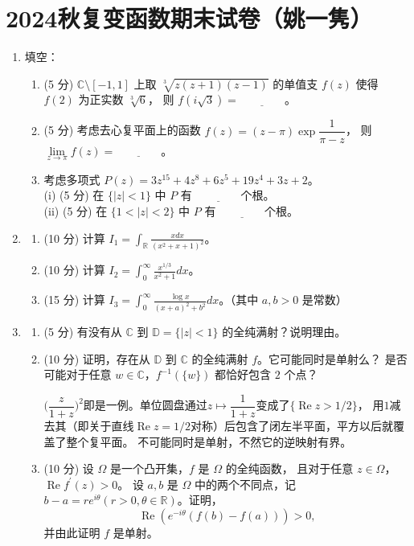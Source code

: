 \section{2024秋复变函数期末试卷（姚一隽）}
\begin{enumerate}
\item[一] 填空：
\begin{enumerate}[label=(\arabic*)]
\item (5 分) $\mathbb{C} \setminus [-1,1]$ 上取 $\sqrt[3]{z(z+1)(z-1)}$ 的单值支 $f(z)$ 使得 $f(2)$ 为正实数 $\sqrt[3]{6}$，
则 $f(i \sqrt{3})=\underline{\qquad\qquad}$。
\item (5 分) 考虑去心复平面上的函数 $f(z)=(z-\pi) \exp \dfrac{1}{\pi-z}$，
则 $\lim\limits_{z \rightarrow \pi} f(z)=\underline{\qquad\qquad}$。
\item 考虑多项式 $P(z)=3z^{15}+4z^{8}+6z^{5}+19z^{4}+3z+2$。\\
(i) (5 分) 在 $\{|z|<1\}$ 中 $P$ 有 $\underline{\qquad\qquad}$个根。\\
(ii) (5 分) 在 $\{1<|z|<2\}$ 中 $P$ 有 $\underline{\qquad\qquad}$个根。
\end{enumerate}

\item[二]
\begin{enumerate}[label=(\arabic*)]
\item (10 分) 计算 $\displaystyle I_{1}=\int_{\mathbb{R}} \frac{x dx}{(x^{2}+x+1)^{2}}$。
\item (10 分) 计算 $\displaystyle I_{2}=\int_{0}^{\infty} \frac{x^{1/3}}{x^{2}+1} dx$。
\item (15 分) 计算 $\displaystyle I_{3}=\int_{0}^{\infty} \frac{\log x}{(x+a)^{2}+b^{2}} dx$。（其中 $a, b>0$ 是常数）
\end{enumerate}

\item[三]
\begin{enumerate}[label=(\arabic*)]
\item (5 分) 有没有从 $\mathbb{C}$ 到 $\mathbb{D}=\{|z|<1\}$ 的全纯满射？说明理由。
\item (10 分) 证明，存在从 $\mathbb{D}$ 到 $\mathbb{C}$ 的全纯满射 $f$。它可能同时是单射么？
是否可能对于任意 $w \in \mathbb{C}$，$f^{-1}(\{w\})$ 都恰好包含 $2$ 个点？
\begin{proofc}[解答]
    $\Big(\dfrac{z}{1+z}\Big)^2$即是一例。单位圆盘通过$z\mapsto\dfrac{1}{1+z}$变成了$\{\operatorname{Re}z>1/2\}$，
    用$1$减去其（即关于直线$\operatorname{Re}z=1/2$对称）后包含了闭左半平面，平方以后就覆盖了整个复平面。
    不可能同时是单射，不然它的逆映射有界。
\end{proofc}
\item (10 分) 设 $\Omega$ 是一个凸开集，$f$ 是 $\Omega$ 的全纯函数，
且对于任意 $z \in \Omega$，$\operatorname{Re} f^{\prime}(z)> 0$。
设 $a, b$ 是 $\Omega$ 中的两个不同点，记 $b-a=r e^{i\theta}(r>0, \theta \in \mathbb{R})$。证明，
\[\operatorname{Re}\left(e^{-i\theta}(f(b)-f(a))\right)>0,\]
并由此证明 $f$ 是单射。
\end{enumerate}


\end{enumerate}
